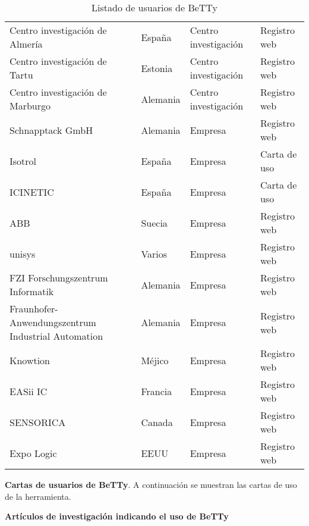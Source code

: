 \begin{table}[htbp]
\begin{tabular}{llll}
    Centro investigación de Almería & España & Centro investigación & Registro web \\
    Centro investigación de Tartu & Estonia & Centro investigación & Registro web \\
    Centro investigación de Marburgo & Alemania & Centro investigación & Registro web \\
    Schnapptack GmbH & Alemania & Empresa & Registro web \\
    Isotrol & España & Empresa & Carta de uso \\
    ICINETIC & España & Empresa & Carta de uso \\
    ABB   & Suecia & Empresa & Registro web \\
    unisys &  Varios     & Empresa & Registro web \\
    FZI Forschungszentrum Informatik & Alemania & Empresa & Registro web \\
    Fraunhofer-Anwendungszentrum Industrial Automation & Alemania & Empresa & Registro web \\
    Knowtion & Méjico & Empresa & Registro web \\
    EASii IC & Francia & Empresa & Registro web \\
    SENSORICA & Canada & Empresa & Registro web \\
    Expo Logic & EEUU  & Empresa & Registro web 
  \end{tabular}
    
  \label{tab:betty-users}
	\caption{Listado de usuarios de BeTTy}
\end{table}

\newpage


\textbf{Cartas de usuarios de BeTTy}. A continuación se muestran las cartas de uso de la herramienta. 


\textbf{Artículos de investigación indicando el uso de BeTTy}



